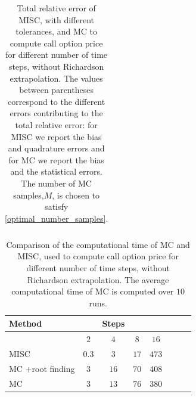 \begin{table}[h!]
\begin{tabular}{l*{6}{c}r}
			\bottomrule[1.25pt]
	\end{tabular}
	\caption{Total relative  error of MISC, with different tolerances, and MC to compute call option price for different number of time steps, without Richardson extrapolation. The values between parentheses correspond to the different errors contributing to the total relative error: for MISC we report the bias and quadrature errors and for MC we report the bias and the statistical errors. The number of MC samples,$ M$, is chosen to satisfy \eqref{optimal_number_samples}.}
	\label{Total error of MISC and MC to compute Call option price of the different tolerances for different number of time steps, without Richardson extrapolation. The numbers between parentheses are the corresponding absolute errors.}
\end{table}

\FloatBarrier




\begin{table}[h!]
	\centering
	\begin{tabular}{l*{6}{c}r}
		\toprule[1.5pt]
	Method & & Steps  & &     \\
	\hline
	         & $2$ & $4$ & $8$ & $16$ &   \\
		\hline
		MISC  & $0.3$ & $3$ & $17$ & $473$  \\
			MC +root finding  & $3$ & $16$ & $70$ & $408$  \\
				MC  & $3$ & $13$ & $76$ & $380$  \\
%		
		\bottomrule[1.25pt]
	\end{tabular}
	\caption{Comparison of the computational time of  MC and MISC, used to compute call option price  for different number of time steps, without Richardson extrapolation. The average computational time of MC is computed over $10$ runs.}
	\label{Comparsion of the computational time of  MC and MISC, used to compute Call option price  for different number of time steps, without Richardson extrapolation}
\end{table}



